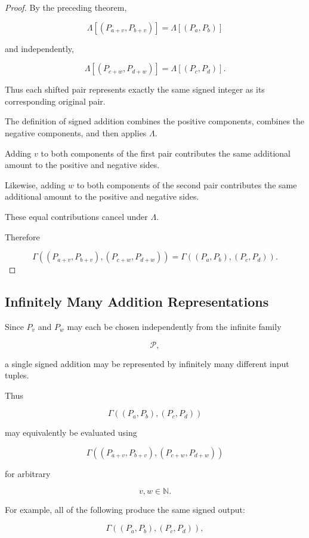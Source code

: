 \documentclass[12pt]{article}
\begin{document}
\begin{proof}

By the preceding theorem,

\[
\Lambda[(P_{a+v},P_{b+v})]
=
\Lambda[(P_a,P_b)]
\]

and independently,

\[
\Lambda[(P_{c+w},P_{d+w})]
=
\Lambda[(P_c,P_d)].
\]

Thus each shifted pair represents exactly the same signed integer as its corresponding original pair.

The definition of signed addition combines the positive components, combines the negative components, and then applies \(\Lambda\).

Adding \(v\) to both components of the first pair contributes the same additional amount to the positive and negative sides.

Likewise, adding \(w\) to both components of the second pair contributes the same additional amount to the positive and negative sides.

These equal contributions cancel under \(\Lambda\).

Therefore

\[
\Gamma
\left(
(P_{a+v},P_{b+v}),
(P_{c+w},P_{d+w})
\right)
=
\Gamma
\left(
(P_a,P_b),(P_c,P_d)
\right).
\]

\end{proof}

\subsection*{Infinitely Many Addition Representations}

Since \(P_v\) and \(P_w\) may each be chosen independently from the infinite family

\[
\mathcal P,
\]

a single signed addition may be represented by infinitely many different input tuples.

Thus

\[
\Gamma
\left(
(P_a,P_b),(P_c,P_d)
\right)
\]

may equivalently be evaluated using

\[
\Gamma
\left(
(P_{a+v},P_{b+v}),
(P_{c+w},P_{d+w})
\right)
\]

for arbitrary

\[
v,w\in\mathbb N.
\]

For example, all of the following produce the same signed output:

\[
\Gamma
\left(
(P_a,P_b),(P_c,P_d)
\right),
\]
\end{document}
